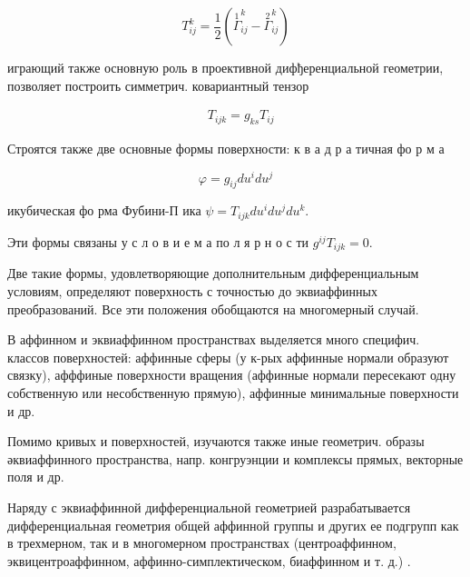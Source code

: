 \documentclass[10pt]{article}
\begin{document}
\[

T_{i j}^{k}=\frac{1}{2}\left(\stackrel{1}{\Gamma}_{i j}^{k}-\stackrel{2}{\Gamma}_{i j}^{k}\right)

\]



играющий также основную роль в проективной дифђеренциальной геометрии, позволяет построить симметрич. ковариантный тензор



\[

\begin{aligned}

& T_{i j k}=g_{k s} T_{i j}

\end{aligned}

\]



Строятся также две основные формы поверхности: к в а д р а тичная фо р м а



\[

\varphi=g_{i j} d u^{i} d u^{j}

\]



икубическая фо рма Фубини-П ика $\psi=T_{i j k} d u^{i} d u^{j} d u^{k}$.



Эти формы связаны у с л о в и е м а по л я р н о с ти $g^{i j} T_{i j k}=0$.



Две такие формы, удовлетворяющие дополнительным дифференциальным условиям, определяют поверхность с точностью до эквиаффинных преобразований. Все эти положения обобщаются на многомерный случай.



В аффинном и эквиаффинном пространствах выделяется много специфич. классов поверхностей: аффинные сферы (у к-рых аффинные нормали образуют связку), афффиные поверхности вращения (аффинные нормали пересекают одну собственную или несобственную прямую), аффинные минимальные поверхности и др.



Помимо кривых и поверхностей, изучаются также иные геометрич. образы әквиаффинного пространства, напр. конгруэнции и комплексы прямых, векторные поля и др.



Наряду с эквиаффинной дифференциальной геометрией разрабатывается дифференциальная геометрия общей аффинной группы и других ее подгрупп как в трехмерном, так и в многомерном пространствах (центроаффинном, эквицентроаффинном, аффинно-симплектическом, биаффинном и т. д.) .
\end{document}

